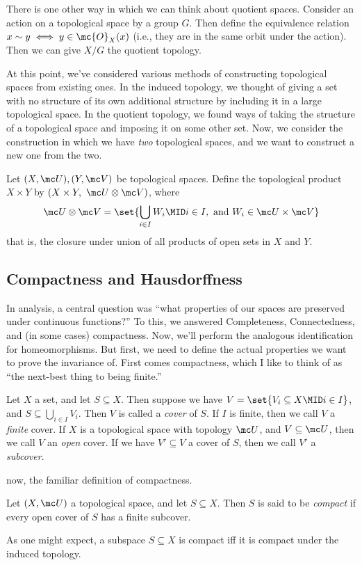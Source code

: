 \documentclass{fkbook}
\theoremstyle{snazzydefinition}
\begin{document}
\begin{adjustwidth}{1em}{1em}
  There is one other way in which we can think about quotient spaces.
  Consider an action on a topological space by a group $G$. Then
  define the equivalence relation $x \sim y \iff y \in \mc{O}_{X}(x)$
  (i.e., they are in the same orbit under the action). Then we can
  give $X/G$ the quotient topology.

  At this point, we've considered various methods of constructing
  topological spaces from existing ones. In the induced topology, we
  thought of giving a set with no structure of its own additional
  structure by including it in a large topological space. In the
  quotient topology, we found ways of taking the structure of a
  topological space and imposing it on some other set. Now, we
  consider the construction in which we have \emph{two} topological
  spaces, and we want to construct a new one from the two.

  \begin{definition}
    Let $(X, \mc U), (Y, \mc V)$ be topological spaces. Define the
    topological product $X \times Y$ by $(X \times Y,\ \mc U \otimes
    \mc V)$, where
    \[
      \mc U \otimes \mc V = \set{\bigcup_{i \in I} W_i \MID i \in I,\
        \text{and}\ W_i \in \mc U \times \mc V}
    \]
    that is, the closure under union of all products of open sets in
    $X$ and $Y$.
  \end{definition}

  \subsection{Compactness and Hausdorffness}
  In analysis, a central question was ``what properties of our spaces
  are preserved under continuous functions?'' To this, we answered
  Completeness, Connectedness, and (in some cases) compactness. Now,
  we'll perform the analogous identification for homeomorphisms. But
  first, we need to define the actual properties we want to prove the
  invariance of. First comes compactness, which I like to think of as
  ``the next-best thing to being finite.''
  \begin{definition}[Covers]
    Let $X$ a set, and let $S \subseteq X$. Then suppose we have $V =
    \set{V_i \subseteq X \MID i \in I}$, and $S \subseteq
    \bigcup_{i\in I} V_i$. Then $V$ is called a \emph{cover} of $S$.
    If $I$ is finite, then we call $V$ a \emph{finite} cover. If $X$
    is a topological space with topology $\mc U$, and $V \subseteq \mc
    U$, then we call $V$ an \emph{open} cover. If we have $V'
    \subseteq V$ a cover of $S$, then we call $V'$ a \emph{subcover}.
  \end{definition}
  now, the familiar definition of compactness. \clearpage
  \begin{definition}
    Let $(X, \mc U)$ a topological space, and let $S \subseteq X$.
    Then $S$ is said to be \emph{compact} if every open cover of $S$
    has a finite subcover.
  \end{definition}
  As one might expect, a subspace $S \subseteq X$ is compact iff it is
  compact under the induced topology.

\end{adjustwidth}
\end{document}

